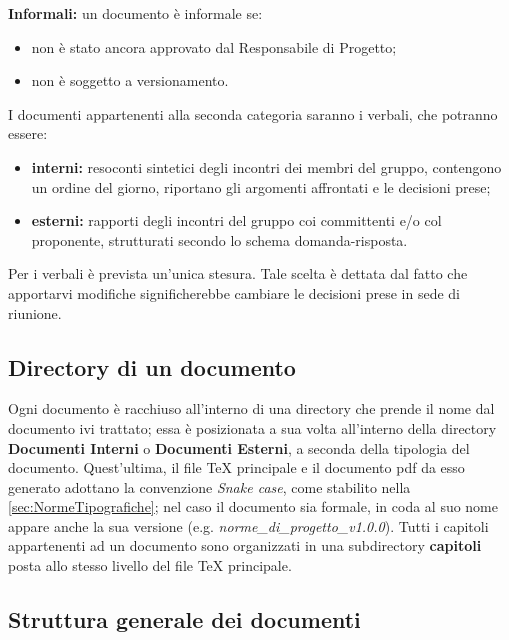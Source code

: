  \textbf{Informali:} un documento è informale se:
\begin{itemize}
\item non è stato ancora approvato dal Responsabile di Progetto;
	\item non è soggetto a versionamento.
\end{itemize}
I documenti appartenenti alla seconda categoria saranno i verbali, che potranno
essere:
\begin{itemize}
\item \textbf{interni:} resoconti sintetici degli incontri dei membri del gruppo, contengono un ordine del giorno, riportano gli argomenti affrontati e le decisioni prese;
	\item \textbf{esterni:} rapporti degli incontri del gruppo coi committenti e/o col proponente, strutturati secondo lo schema domanda-risposta.
\end{itemize}
Per i verbali è prevista un’unica stesura. Tale scelta è dettata dal fatto che apportarvi modifiche significherebbe cambiare le decisioni prese in sede di riunione.
\subsection{Directory di un documento}\label{3.1.6}
Ogni documento è racchiuso all'interno di una directory che prende il nome dal documento ivi trattato; essa è posizionata a sua volta all'interno della directory \textbf{Documenti Interni} o \textbf{Documenti Esterni}, a seconda della tipologia del documento. Quest'ultima, il file \TeX{} principale e il documento pdf da esso generato adottano la convenzione \textit{Snake case}, come stabilito nella \autoref{sec:NormeTipografiche}; nel caso il documento sia formale, in coda al suo nome appare anche la sua versione (e.g. \textit{norme\_di\_progetto\_v1.0.0}).
Tutti i capitoli appartenenti ad un documento sono organizzati in una subdirectory \textbf{capitoli} posta allo stesso livello del file \TeX{} principale.
\subsection{Struttura generale dei documenti}\label{3.1.7}

